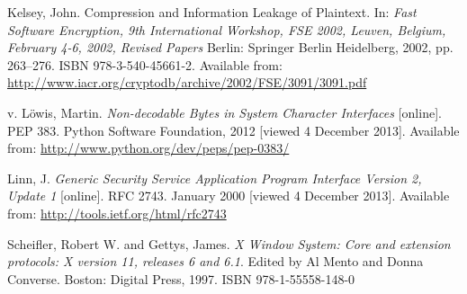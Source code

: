 \begin{thebibliography}{99}
	{\sc Kelsey,} John.
	Compression and Information Leakage of Plaintext.
	In: \emph{Fast Software Encryption, 9th International Workshop, FSE 2002,
	Leuven, Belgium, February 4-6, 2002, Revised Papers}
	Berlin: Springer Berlin Heidelberg, 2002, pp. 263--276.
	ISBN 978-3-540-45661-2.
	Available from: \url{http://www.iacr.org/cryptodb/archive/2002/FSE/3091/3091.pdf}

	{\sc v. Löwis,} Martin.
	\emph{Non-decodable Bytes in System Character Interfaces}
	[online].
	PEP 383.
	Python Software Foundation, 2012 [viewed 4 December 2013].
	Available from: \url{http://www.python.org/dev/peps/pep-0383/}

	{\sc Linn,} J.
	\emph{Generic Security Service Application Program Interface Version 2, Update 1}
	[online].
	RFC 2743.
	January 2000 [viewed 4 December 2013].
	Available from: \url{http://tools.ietf.org/html/rfc2743}

	{\sc Scheifler,} Robert W. and {\sc Gettys,} James.
	\emph{X Window System: Core and extension protocols: X version 11, releases 6 and 6.1}.
	Edited by Al Mento and Donna Converse.
	Boston: Digital Press, 1997.
	ISBN 978-1-55558-148-0



\end{thebibliography}
